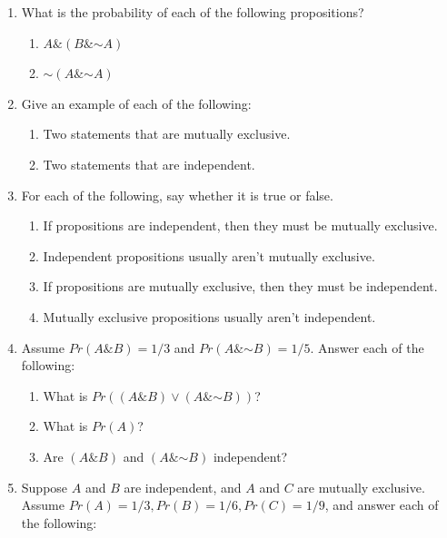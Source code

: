 \documentclass[justified]{tufte-book}
\providecommand{\tightlist}{%
  \setlength{\itemsep}{0pt}\setlength{\parskip}{0pt}}
\renewcommand{\neg}{\mathbin{\sim}}
\renewcommand{\wedge}{\mathbin{\&}}
\newcommand{\p}{Pr}
\theoremstyle{definition}
\theoremstyle{definition}
\theoremstyle{definition}
\theoremstyle{remark}
\begin{document}
\begin{enumerate}
\item
  What is the probability of each of the following propositions?

  \begin{enumerate}
  \def\labelenumii{\alph{enumii}.}
  \tightlist
  \item
    \(A \wedge (B \wedge \neg A)\)
  \item
    \(\neg (A \wedge \neg A)\)
  \end{enumerate}
\item
  Give an example of each of the following:

  \begin{enumerate}
  \def\labelenumii{\alph{enumii}.}
  \tightlist
  \item
    Two statements that are mutually exclusive.
  \item
    Two statements that are independent.
  \end{enumerate}
\item
  For each of the following, say whether it is true or false.

  \begin{enumerate}
  \def\labelenumii{\alph{enumii}.}
  \tightlist
  \item
    If propositions are independent, then they must be mutually exclusive.
  \item
    Independent propositions usually aren't mutually exclusive.
  \item
    If propositions are mutually exclusive, then they must be independent.
  \item
    Mutually exclusive propositions usually aren't independent.
  \end{enumerate}
\item
  Assume \(Pr(A \wedge B)=1/3\) and \(Pr(A \wedge \neg B)=1/5\). Answer each of the following:

  \begin{enumerate}
  \def\labelenumii{\alph{enumii}.}
  \tightlist
  \item
    What is \(Pr((A \wedge B) \vee (A \wedge \neg B))\)?
  \item
    What is \(Pr(A)\)?
  \item
    Are \((A \wedge B)\) and \((A \wedge \neg B)\) independent?
  \end{enumerate}
\item
  Suppose \(A\) and \(B\) are independent, and \(A\) and \(C\) are mutually exclusive. Assume \(\p(A) = 1/3, \p(B) = 1/6, \p(C) = 1/9\), and answer each of the following:


\end{enumerate}
\end{document}
